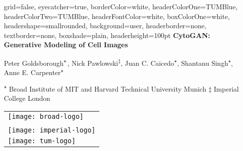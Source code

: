 \documentclass[a0paper,portrait]{baposter}
\newcommand{\aff}{\textsuperscript{$\star$}}
\begin{document}



\begin{poster}{
  grid=false,
  eyecatcher=true,
  borderColor=white,
  headerColorOne=TUMBlue,
  headerColorTwo=TUMBlue,
  headerFontColor=white,
  boxColorOne=white,
  headershape=smallrounded,
  background=user,
  headerborder=none,
  textborder=none,
  boxshade=plain,
  headerheight=100pt
}
{
}
{
  {\bf CytoGAN: Generative Modeling of Cell Images}
  \vspace{3mm}
}
{
  \smaller[0.5]
  \hspace{-3mm}Peter Goldsborough\textsuperscript{$\star$\,\textdagger}, Nick Pawlowski\textsuperscript{$\ddagger$}, Juan C. Caicedo\aff, Shantanu Singh\aff, Anne E. Carpenter\aff

  \vspace{2mm}
  {
    \smaller[1]
    \textsuperscript{$\star$} Broad Institute of MIT and Harvard \hspace{3mm}%
    \textdagger\hspace{2pt} Technical University Munich \hspace{3mm}%
    $\ddagger$ Imperial College London
  }
}
{
  \begin{tabular}{l}
    \texttt{[image: broad-logo]}\\
    \vspace{-2mm}\\
    \texttt{[image: imperial-logo]}
    \vspace{-2mm}\\
    \texttt{[image: tum-logo]}\\
  \end{tabular}
}


\end{poster}
\end{document}
